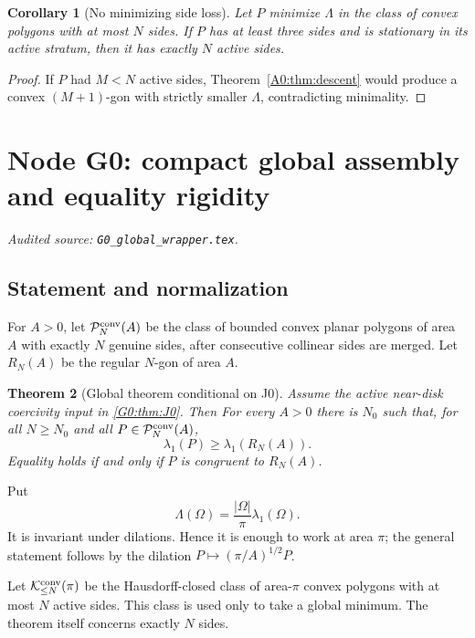 \documentclass[11pt]{amsart}
\numberwithin{equation}{section}
\newtheorem{theorem}{Theorem}[section]
\newtheorem{corollary}[theorem]{Corollary}
\theoremstyle{definition}
\theoremstyle{remark}
\newcommand{\Kclass}{\mathcal K}
\newcommand{\Pclass}{\mathcal P}
\newcommand{\LambdaF}{\Lambda}
\begin{document}
\begin{corollary}[No minimizing side loss]\label{A0:cor:no-loss}
Let \(P\) minimize \(\Lambda\) in the class of convex polygons with at
most \(N\) sides.  If \(P\) has at least three sides and is stationary in
its active stratum, then it has exactly \(N\) active sides.
\end{corollary}

\begin{proof}
If \(P\) had \(M<N\) active sides, Theorem~\ref{A0:thm:descent} would produce
a convex \((M+1)\)-gon with strictly smaller \(\Lambda\), contradicting
minimality.
\end{proof}
\endgroup

\begingroup
\section{Node G0: compact global assembly and equality rigidity}
\label{module:G0}
\noindent\textit{Audited source: \nolinkurl{G0_global_wrapper.tex}.}
\subsection{Statement and normalization}

For $A>0$, let $\Pclass_N^{\rm conv}(A)$ be the class of bounded convex
planar polygons of area $A$ with exactly $N$ genuine sides, after
consecutive collinear sides are merged.  Let $R_N(A)$ be the regular
$N$-gon of area $A$.

\begin{theorem}[Global theorem conditional on J0]
\label{G0:thm:main}
Assume the active near-disk coercivity input in
\ref{G0:thm:J0}.  Then
For every $A>0$ there is $N_0$ such that, for all $N\ge N_0$ and all
$P\in\Pclass_N^{\rm conv}(A)$,
\begin{equation}\label{G0:eq:main}
 \lambda_1(P)\ge\lambda_1(R_N(A)).
\end{equation}
Equality holds if and only if $P$ is congruent to $R_N(A)$.
\end{theorem}

Put
\begin{equation}\label{G0:eq:Lambda}
 \LambdaF(\Omega)=\frac{|\Omega|}{\pi}\lambda_1(\Omega).
\end{equation}
It is invariant under dilations.  Hence it is enough to work at area
$\pi$; the general statement follows by the dilation
$P\mapsto(\pi/A)^{1/2}P$.

Let $\Kclass_{\le N}^{\rm conv}(\pi)$ be the Hausdorff-closed class of
area-$\pi$ convex polygons with at most $N$ active sides.  This class is
used only to take a global minimum.  The theorem itself concerns exactly
$N$ sides.
\end{document}
